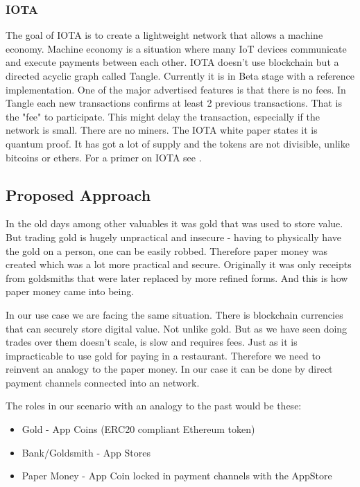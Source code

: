 \subsubsection{IOTA}
The goal of IOTA is to create a lightweight network that allows a machine economy. Machine economy is a situation where many IoT devices communicate and execute payments between each other. IOTA doesn't use blockchain but a directed acyclic graph called Tangle. Currently it is in Beta stage with a reference implementation. One of the major advertised features is that there is no fees. In Tangle each new transactions confirms at least 2 previous transactions. That is the "fee" to participate. This might delay the transaction, especially if the network is small. There are no miners. The IOTA white paper states it is quantum proof. It has got a lot of supply and the tokens are not divisible, unlike bitcoins or ethers. For a primer on IOTA see \cite{IOTA}.

\subsection{Proposed Approach}
In the old days among other valuables it was gold that was used to store value. But trading gold is hugely unpractical and insecure - having to physically have the gold on a person, one can be easily robbed. Therefore paper money was created which was a lot more practical and secure. Originally it was only receipts from goldsmiths that were later replaced by more refined forms. And this is how paper money came into being.

In our use case we are facing the same situation. There is blockchain currencies that can securely store digital value. Not unlike gold. But as we have seen doing trades over them doesn't scale, is slow and requires fees. Just as it is impracticable to use gold for paying in a restaurant. Therefore we need to reinvent an analogy to the paper money. In our case it can be done by direct payment channels connected into an network.

The roles in our scenario with an analogy to the past would be these:

\begin{itemize}
    \item Gold - App Coins (ERC20 compliant Ethereum token)
    \item Bank/Goldsmith - App Stores
    \item Paper Money - App Coin locked in payment channels with the AppStore
\end{itemize}

